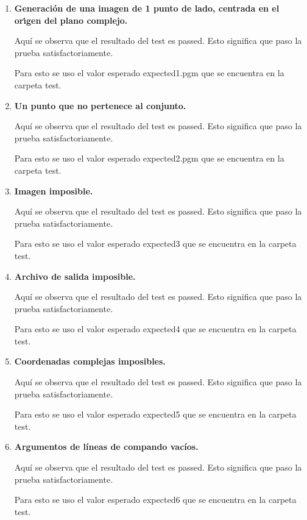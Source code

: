 \documentclass{article}
\begin{document}
\begin{enumerate}
   
    \item \textbf{Generación de una imagen de 1 punto de lado, centrada en el orı́gen del plano 	complejo.}\n

	Aquí se observa que el resultado del test es passed. Esto significa que paso la prueba satisfactoriamente.
	
	Para esto se uso el valor esperado expected1.pgm que se encuentra en la carpeta test.
    
    \item \textbf{Un punto que no pertenece al conjunto.}

	Aquí se observa que el resultado del test es passed. Esto significa que paso la prueba satisfactoriamente.    
	
	Para esto se uso el valor esperado expected2.pgm que se encuentra en la carpeta test.
	
    
    \item \textbf{Imagen imposible.}

	Aquí se observa que el resultado del test es passed. Esto significa que paso la prueba satisfactoriamente. 
	
	Para esto se uso el valor esperado expected3 que se encuentra en la carpeta test.   

	\item \textbf{Archivo de salida imposible.}    
	
	Aquí se observa que el resultado del test es passed. Esto significa que paso la prueba satisfactoriamente. 
	
	Para esto se uso el valor esperado expected4 que se encuentra en la carpeta test.
	
	\item \textbf{Coordenadas complejas imposibles.}   
	
	Aquí se observa que el resultado del test es passed. Esto significa que paso la prueba satisfactoriamente. 
	
	Para esto se uso el valor esperado expected5 que se encuentra en la carpeta test.
	
	\item \textbf{Argumentos de líneas de compando vacíos.}    
	
	Aquí se observa que el resultado del test es passed. Esto significa que paso la prueba satisfactoriamente. 
	
	Para esto se uso el valor esperado expected6 que se encuentra en la carpeta test.
    
\end{enumerate}
\end{document}
